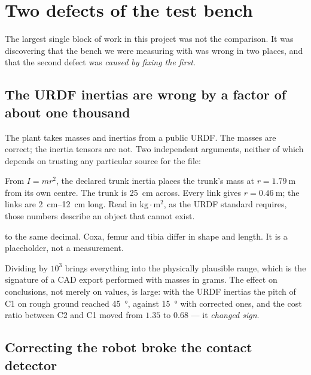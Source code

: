 \documentclass[11pt,a4paper]{article}
\newcommand{\Co}{\textsf{C1}}
\newcommand{\Ct}{\textsf{C2}}
\begin{document}
\section{Two defects of the test bench}
\label{sec:defects}

The largest single block of work in this project was not the comparison. It
was discovering that the bench we were measuring with was wrong in two places,
and that the second defect was \emph{caused by fixing the first}.

\subsection{The URDF inertias are wrong by a factor of about one thousand}
\label{sec:inertias}

The plant takes masses and inertias from a public URDF. The masses are
correct; the inertia tensors are not. Two independent arguments, neither of
which depends on trusting any particular source for the file:

\begin{description}[style=nextline,leftmargin=10pt]
\item[Radius of gyration.] From $I = m r^2$, the declared trunk inertia places
the trunk's mass at $r = \SI{1.79}{\meter}$ from its own centre. The trunk is
\SI{25}{\centi\meter} across. Every link gives $r = \SI{0.46}{\meter}$; the
links are \SIrange{2}{12}{\centi\meter} long. Read in
$\mathrm{kg}\cdot\mathrm{m}^2$, as the URDF standard requires, those numbers
describe an object that cannot exist.
\item[All 24 links carry identical inertia,] to the same decimal. Coxa, femur
and tibia differ in shape and length. It is a placeholder, not a measurement.
\end{description}

Dividing by $10^3$ brings everything into the physically plausible range,
which is the signature of a CAD export performed with masses in grams. The
effect on conclusions, not merely on values, is large: with the URDF inertias
the pitch of \Co{} on rough ground reached \SI{45}{\degree}, against
\SI{15}{\degree} with corrected ones, and the cost ratio between \Ct{} and
\Co{} moved from $1.35$ to $0.68$ --- it \emph{changed sign}.

\subsection{Correcting the robot broke the contact detector}
\label{sec:estimator}
\end{document}
